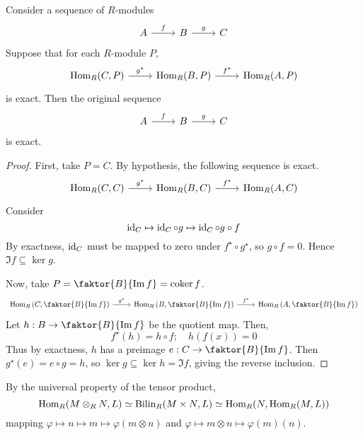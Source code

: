 \begin{lemma}
    Consider a sequence of \( R \)-modules
    \[\begin{tikzcd}
        A & B & C
        \arrow["f", from=1-1, to=1-2]
        \arrow["g", from=1-2, to=1-3]
    \end{tikzcd}\]
    Suppose that for each \( R \)-module \( P \),
    \[\begin{tikzcd}
        {\Hom_R(C, P)} & {\Hom_R(B, P)} & {\Hom_R(A, P)}
        \arrow["{g^\star}", from=1-1, to=1-2]
        \arrow["{f^\star}", from=1-2, to=1-3]
    \end{tikzcd}\]
    is exact.
    Then the original sequence
    \[\begin{tikzcd}
        A & B & C
        \arrow["f", from=1-1, to=1-2]
        \arrow["g", from=1-2, to=1-3]
    \end{tikzcd}\]
    is exact.
\end{lemma}
\begin{proof}
    First, take \( P = C \).
    By hypothesis, the following sequence is exact.
    \[\begin{tikzcd}
        {\Hom_R(C, C)} & {\Hom_R(B, C)} & {\Hom_R(A, C)}
        \arrow["{g^\star}", from=1-1, to=1-2]
        \arrow["{f^\star}", from=1-2, to=1-3]
    \end{tikzcd}\]
    Consider
    \[ \operatorname{id}_C \mapsto \operatorname{id}_C \circ g \mapsto \operatorname{id}_C \circ g \circ f \]
    By exactness, \( \operatorname{id}_C \) must be mapped to zero under \( f^\star \circ g^\star \), so \( g \circ f = 0 \).
    Hence \( \Im f \subseteq \ker g \).

    Now, take \( P = \faktor{B}{\Im f} = \coker f \).
    \[\begin{tikzcd}
        {\Hom_R\qty(C, \faktor{B}{\Im f})} & {\Hom_R\qty(B, \faktor{B}{\Im f})} & {\Hom_R\qty(A, \faktor{B}{\Im f})}
        \arrow["{g^\star}", from=1-1, to=1-2]
        \arrow["{f^\star}", from=1-2, to=1-3]
    \end{tikzcd}\]
    Let \( h : B \to \faktor{B}{\Im f} \) be the quotient map.
    Then,
    \[ f^\star(h) = h \circ f;\quad h(f(x)) = 0 \]
    Thus by exactness, \( h \) has a preimage \( e : C \to \faktor{B}{\Im f} \).
    Then \( g^\star(e) = e \circ g = h \), so \( \ker g \subseteq \ker h = \Im f \), giving the reverse inclusion.
\end{proof}
By the universal property of the tensor product,
\[ \operatorname{Hom}_R(M \otimes_R N, L) \simeq \operatorname{Bilin}_R(M \times N, L) \simeq \operatorname{Hom}_R(N, \operatorname{Hom}_R(M, L)) \]
mapping \( \varphi \mapsto n \mapsto m \mapsto \varphi(m \otimes n) \) and \( \varphi \mapsto m \otimes n \mapsto \varphi(m)(n) \).
